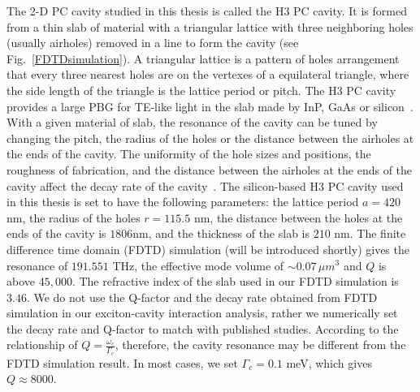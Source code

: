 The 2-D PC cavity studied in this thesis is called the H3 PC cavity. It is formed from a thin slab of material with a triangular lattice with three neighboring holes (usually airholes) removed in a line to form the cavity (see Fig.~\ref{FDTDsimulation}). A triangular lattice is a pattern of holes arrangement that every three nearest holes are on the vertexes of a equilateral triangle, where the side length of the triangle is the lattice period or pitch. The H3 PC cavity provides a large PBG for TE-like light in the slab made by InP, GaAs or silicon~\cite{Johnson2002a}. With a given material of slab, the resonance of the cavity can be tuned by changing the pitch, the radius of the holes or the distance between the airholes at the ends of the cavity. The uniformity of the hole sizes and positions, the roughness of fabrication, and the distance between the airholes at the ends of the cavity affect the decay rate of the cavity~\cite{Akahane2003}. The silicon-based H3 PC cavity used in this thesis is set to have the following parameters: the lattice period $a=420$ nm, the radius of the holes $r=115.5$ nm, the distance between the holes at the ends of the cavity is $1806$nm, and the thickness of the slab is $210$ nm. The finite difference time domain (FDTD) simulation (will be introduced shortly) gives the resonance of $191.551$ THz, the effective mode volume of $\sim 0.07\,\mu m^3$ and $Q$ is above $45,000$. The refractive index of the slab used in our FDTD simulation is $3.46$. We do not use the Q-factor and the decay rate obtained from FDTD simulation in our exciton-cavity interaction analysis, rather we numerically set the decay rate and Q-factor to match with published studies. According to the relationship of $Q=\frac{\omega_c}{\Gamma_c}$, therefore, the cavity resonance may be different from the FDTD simulation result. In most cases, we set $\Gamma_c=0.1$ meV, which gives $Q\approx 8000$.

